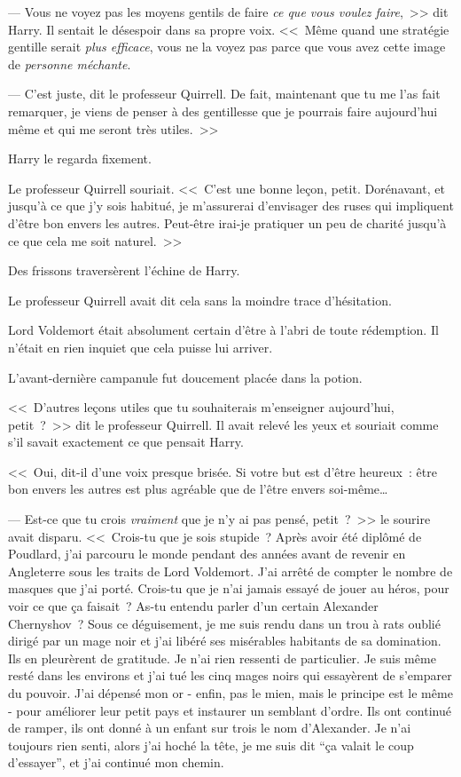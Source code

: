 --- Vous ne voyez pas les moyens gentils de faire \emph{ce que vous voulez faire},~>> dit Harry. Il sentait le désespoir dans sa propre voix. <<~Même quand une stratégie gentille serait \emph{plus efficace}, vous ne la voyez pas parce que vous avez cette image de \emph{personne méchante}.

--- C'est juste, dit le professeur Quirrell. De fait, maintenant que tu me l'as fait remarquer, je viens de penser à des gentillesse que je pourrais faire aujourd'hui même et qui me seront très utiles.~>>

Harry le regarda fixement.

Le professeur Quirrell souriait. <<~C'est une bonne leçon, petit. Dorénavant, et jusqu'à ce que j'y sois habitué, je m'assurerai d'envisager des ruses qui impliquent d'être bon envers les autres. Peut-être irai-je pratiquer un peu de charité jusqu'à ce que cela me soit naturel.~>>

Des frissons traversèrent l'échine de Harry.

Le professeur Quirrell avait dit cela sans la moindre trace d'hésitation.

Lord Voldemort était absolument certain d'être à l'abri de toute rédemption. Il n'était en rien inquiet que cela puisse lui arriver.

L'avant-dernière campanule fut doucement placée dans la potion.

<<~D'autres leçons utiles que tu souhaiterais m'enseigner aujourd'hui, petit~?~>> dit le professeur Quirrell. Il avait relevé les yeux et souriait comme s'il savait exactement ce que pensait Harry.

<<~Oui, dit-il d'une voix presque brisée. Si votre but est d'être heureux~: être bon envers les autres est plus agréable que de l'être envers soi-même…

--- Est-ce que tu crois \emph{vraiment} que je n'y ai pas pensé, petit~?~>> le sourire avait disparu. <<~Crois-tu que je sois stupide~? Après avoir été diplômé de Poudlard, j'ai parcouru le monde pendant des années avant de revenir en Angleterre sous les traits de Lord Voldemort. J'ai arrêté de compter le nombre de masques que j'ai porté. Crois-tu que je n'ai jamais essayé de jouer au héros, pour voir ce que ça faisait~? As-tu entendu parler d'un certain Alexander Chernyshov~? Sous ce déguisement, je me suis rendu dans un trou à rats oublié dirigé par un mage noir et j'ai libéré ses misérables habitants de sa domination. Ils en pleurèrent de gratitude. Je n'ai rien ressenti de particulier. Je suis même resté dans les environs et j'ai tué les cinq mages noirs qui essayèrent de s'emparer du pouvoir. J'ai dépensé mon or - enfin, pas le mien, mais le principe est le même - pour améliorer leur petit pays et instaurer un semblant d'ordre. Ils ont continué de ramper, ils ont donné à un enfant sur trois le nom d'Alexander. Je n'ai toujours rien senti, alors j'ai hoché la tête, je me suis dit “ça valait le coup d'essayer”, et j'ai continué mon chemin.

